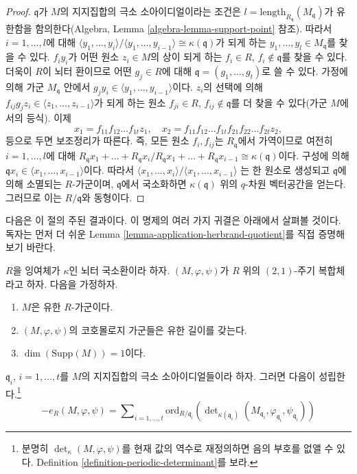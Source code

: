 \begin{proof}
$\mathfrak q$가 $M$의 지지집합의 극소 소아이디얼이라는 조건은
$l = \text{length}_{R_\mathfrak q}(M_\mathfrak q)$가 유한함을
함의한다(Algebra, Lemma \ref{algebra-lemma-support-point} 참조).
따라서 $i = 1, \ldots, l$에 대해
$\langle y_1, \ldots, y_i\rangle / \langle y_1, \ldots, y_{i - 1}\rangle
\cong \kappa(\mathfrak q)$가 되게 하는
$y_1, \ldots, y_l \in M_{\mathfrak q}$를 찾을 수 있다.
$f_i y_i$가 어떤 원소 $z_i \in M$의 상이 되게 하는
$f_i \in R$, $f_i \not \in \mathfrak q$를 찾을 수 있다.
더욱이 $R$이 뇌터 환이므로 어떤 $g_j \in R$에 대해
$\mathfrak q = (g_1, \ldots, g_t)$로 쓸 수 있다. 가정에 의해 가군
$M_{\mathfrak q}$ 안에서
$g_j y_i \in \langle y_1, \ldots, y_{i - 1} \rangle$이다.
$z_i$의 선택에 의해
$f_{ij} g_j z_i \in \langle z_1, \ldots, z_{i - 1} \rangle$가 되게
하는 원소 $f_{ji} \in R$, $f_{ij} \not \in \mathfrak q$를 더 찾을 수
있다(가군 $M$에서의 등식). 이제
$$
x_1 = f_{11}f_{12}\ldots f_{1t}z_1,
\quad
x_2 = f_{11}f_{12}\ldots f_{1t}f_{21}f_{22}\ldots f_{2t}z_2,
$$
등으로 두면 보조정리가 따른다. 즉, 모든 원소 $f_i, f_{ij}$는
$R_{\mathfrak q}$에서 가역이므로 여전히 $i = 1, \ldots, l$에 대해
$R_{\mathfrak q}x_1 + \ldots + R_{\mathfrak q}x_i /
R_{\mathfrak q}x_1 + \ldots + R_{\mathfrak q}x_{i - 1}
\cong \kappa(\mathfrak q)$이다. 구성에 의해
$\mathfrak q x_i \in \langle x_1, \ldots, x_{i - 1}\rangle$이다.
따라서
$\langle x_1, \ldots, x_i\rangle / \langle x_1, \ldots, x_{i - 1}\rangle$
는 한 원소로 생성되고 $\mathfrak q$에 의해 소멸되는 $R$-가군이며,
$\mathfrak q$에서 국소화하면 $\kappa(\mathfrak q)$ 위의 $q$-차원
벡터공간을 얻는다. 그러므로 이는 $R/\mathfrak q$와 동형이다.
\end{proof}

\noindent
다음은 이 절의 주된 결과이다. 이 명제의 여러 가지 귀결은 아래에서
살펴볼 것이다. 독자는 먼저 더 쉬운 Lemma
\ref{lemma-application-herbrand-quotient}를 직접 증명해 보기 바란다.

\begin{proposition}
\label{proposition-length-determinant-periodic-complex}
$R$을 잉여체가 $\kappa$인 뇌터 국소환이라 하자.
$(M, \varphi, \psi)$가 $R$ 위의 $(2, 1)$-주기 복합체라고 하자.
다음을 가정하자.
\begin{enumerate}
\item $M$은 유한 $R$-가군이다.
\item $(M, \varphi, \psi)$의 코호몰로지 가군들은 유한 길이를 갖는다.
\item $\dim(\text{Supp}(M)) = 1$이다.
\end{enumerate}
$\mathfrak q_i$, $i = 1, \ldots, t$를 $M$의 지지집합의 극소
소아이디얼들이라 하자. 그러면 다음이 성립한다.\footnote{
분명히 $\det_\kappa(M, \varphi, \psi)$를 현재 값의 역수로
재정의하면 음의 부호를 없앨 수 있다. Definition
\ref{definition-periodic-determinant}를 보라.}
$$
- e_R(M, \varphi, \psi) =
\sum\nolimits_{i = 1, \ldots, t}
\text{ord}_{R/\mathfrak q_i}\left(
\det\nolimits_{\kappa(\mathfrak q_i)}
(M_{\mathfrak q_i}, \varphi_{\mathfrak q_i}, \psi_{\mathfrak q_i})
\right)
$$
\end{proposition}

